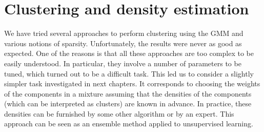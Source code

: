 \section{Clustering and density estimation}
We have tried several approaches to perform clustering using the GMM and various notions of sparsity. Unfortunately, the results were never as good as expected. One of the reasons is that all these approaches are too complex to be easily understood. In particular, they involve a number of parameters to be tuned, which turned out to be a difficult task. This led us to consider a slightly simpler task investigated in next chapters. It corresponds to choosing the weights of the components in a mixture assuming that the densities of the components (which can be interpreted as clusters) are known in advance. In practice, these densities can be furnished by some other algorithm or by an expert. This approach can be seen as an ensemble method applied to unsupervised learning.